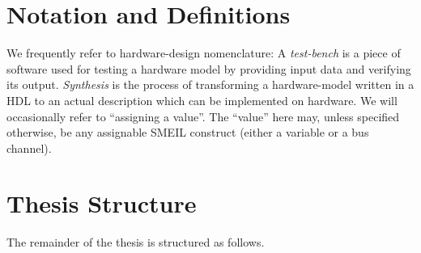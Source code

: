 \section{Notation and Definitions}
We frequently refer to hardware-design nomenclature: A {\itshape test-bench} is a
piece of software used for testing a hardware model by providing input data and
verifying its output. {\itshape Synthesis} is the process of transforming a
hardware-model written in a HDL to an actual description which can be
implemented on hardware. We will occasionally refer to ``assigning a
value''. The ``value'' here may, unless specified otherwise, be any assignable
SMEIL construct (either a variable or a bus channel).

\section{Thesis Structure}
The remainder of the thesis is structured as follows.






